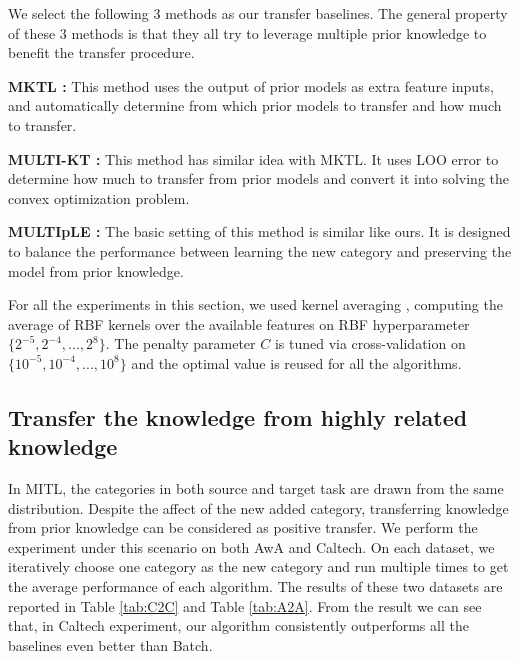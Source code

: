 We select the following 3 methods as our transfer baselines. The general property of these 3 methods is that they all try to leverage multiple prior knowledge to benefit the transfer procedure.

\textbf{MKTL \cite{jie2011multiclass}:} This method uses the output of prior models as extra feature inputs, and automatically determine from which prior models to transfer and how much to transfer.


\textbf{MULTI-KT \cite{tommasi2014learning}:} This method has similar idea with MKTL. It uses LOO error to determine how much to transfer from prior models and convert it into solving the convex optimization problem.

\textbf{MULTIpLE \cite{kuzborskij2013n}:} The basic setting of this method is similar like ours. It is designed to balance the performance between learning the new category and preserving the model from prior knowledge.

For all the experiments in this section, we used kernel averaging \cite{gehler2009feature}, computing the average of RBF kernels over the available features on RBF hyperparameter $\{2^{-5},2^{-4},...,2^8\}$. The penalty parameter $C$ is tuned via cross-validation on $\{10^{-5},10^{-4},...,10^8\}$ and the optimal value is reused for all the algorithms.

\subsection{Transfer the knowledge from highly related knowledge}

In MITL, the categories in both source and target task are drawn from the same distribution. Despite the affect of the new added category, transferring knowledge from prior knowledge can be considered as positive transfer. We perform the experiment under this scenario on both AwA and Caltech. On each dataset, we iteratively choose one category as the new category and run multiple times to get the average performance of each algorithm. The results of these two datasets are reported in Table \ref{tab:C2C} and Table \ref{tab:A2A}. From the result we can see that, in Caltech experiment, our algorithm consistently outperforms all the baselines even better than Batch.


